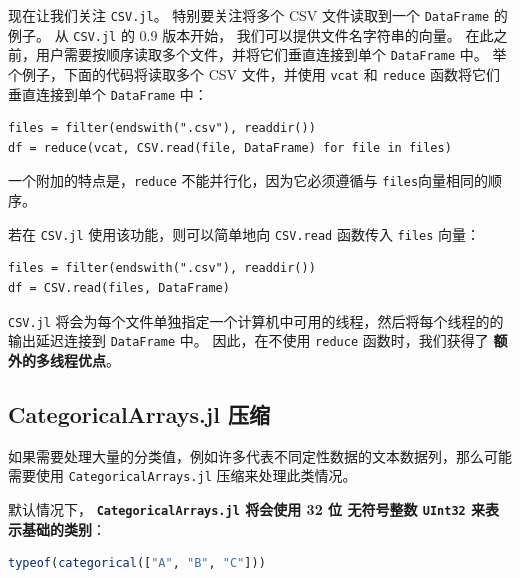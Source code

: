 \documentclass[
  notoc %
]{tufte-book}
\newcommand{\passthrough}[1]{#1}
\begin{document}
现在让我们关注 \passthrough{\lstinline!CSV.jl!}。 特别要关注将多个 CSV
文件读取到一个 \passthrough{\lstinline!DataFrame!} 的例子。 从
\passthrough{\lstinline!CSV.jl!} 的 0.9 版本开始，
我们可以提供文件名字符串的向量。
在此之前，用户需要按顺序读取多个文件，并将它们垂直连接到单个
\passthrough{\lstinline!DataFrame!} 中。 举个例子，下面的代码将读取多个
CSV 文件，并使用 \passthrough{\lstinline!vcat!} 和
\passthrough{\lstinline!reduce!} 函数将它们垂直连接到单个
\passthrough{\lstinline!DataFrame!} 中：

\begin{lstlisting}
files = filter(endswith(".csv"), readdir())
df = reduce(vcat, CSV.read(file, DataFrame) for file in files)
\end{lstlisting}

一个附加的特点是，\passthrough{\lstinline!reduce!}
不能并行化，因为它必须遵循与
\passthrough{\lstinline!files!}向量相同的顺序。

若在 \passthrough{\lstinline!CSV.jl!} 使用该功能，则可以简单地向
\passthrough{\lstinline!CSV.read!} 函数传入
\passthrough{\lstinline!files!} 向量：

\begin{lstlisting}
files = filter(endswith(".csv"), readdir())
df = CSV.read(files, DataFrame)
\end{lstlisting}

\passthrough{\lstinline!CSV.jl!}
将会为每个文件单独指定一个计算机中可用的线程，然后将每个线程的的输出延迟连接到
\passthrough{\lstinline!DataFrame!} 中。 因此，在不使用
\passthrough{\lstinline!reduce!} 函数时，我们获得了
\textbf{额外的多线程优点}。

\hypertarget{sec:df_performance_categorical_compression}{%
\subsection{CategoricalArrays.jl
压缩}\label{sec:df_performance_categorical_compression}}

如果需要处理大量的分类值，例如许多代表不同定性数据的文本数据列，那么可能需要使用
\passthrough{\lstinline!CategoricalArrays.jl!} 压缩来处理此类情况。

默认情况下， \textbf{\passthrough{\lstinline!CategoricalArrays.jl!}
将会使用 32 位 无符号整数 \passthrough{\lstinline!UInt32!}
来表示基础的类别}：

\begin{lstlisting}[language=Julia]
typeof(categorical(["A", "B", "C"]))
\end{lstlisting}
\end{document}
